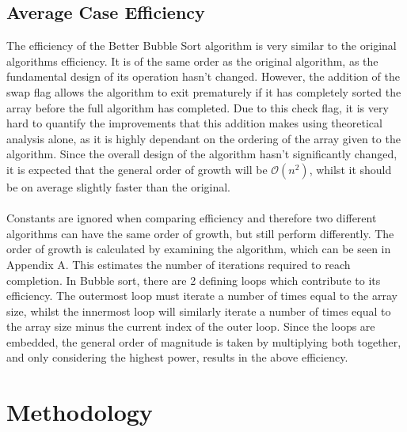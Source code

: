 \documentclass[]{article}
\begin{document}
\subsection{Average Case Efficiency}
The efficiency of the Better Bubble Sort algorithm is very similar to the original algorithms efficiency. It is of the same order as the original algorithm, as the fundamental design of its operation hasn't changed. However, the addition of the swap flag allows the algorithm to exit prematurely if it has completely sorted the array before the full algorithm has completed. Due to this check flag, it is very hard to quantify the improvements that this addition makes using theoretical analysis alone, as it is highly dependant on the ordering of the array given to the algorithm. Since the overall design of the algorithm hasn't significantly changed, it is expected that the general order of growth will be $\mathcal{O}(n^2)$, whilst it should be on average slightly faster than the original. 
\\\\
Constants are ignored when comparing efficiency and therefore two different algorithms can have the same order of growth, but still perform differently. The order of growth is calculated by examining the algorithm, which can be seen in Appendix A. This estimates the number of iterations required to reach completion. In Bubble sort, there are 2 defining loops which contribute to its efficiency. The outermost loop must iterate a number of times equal to the array size, whilst the innermost loop will similarly iterate a number of times equal to the array size minus the current index of the outer loop. Since the loops are embedded, the general order of magnitude is taken by multiplying both together, and only considering the highest power, results in the above efficiency. 
\section{Methodology}
\end{document}
